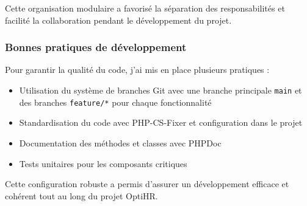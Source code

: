 Cette organisation modulaire a favorisé la séparation des responsabilités et facilité la collaboration pendant le développement du projet.

\subsubsection{Bonnes pratiques de développement}
Pour garantir la qualité du code, j'ai mis en place plusieurs pratiques :

\begin{itemize}
    \item Utilisation du système de branches Git avec une branche principale \texttt{main} et des branches \texttt{feature/*} pour chaque fonctionnalité
    \item Standardisation du code avec PHP-CS-Fixer et configuration dans le projet
    \item Documentation des méthodes et classes avec PHPDoc
    \item Tests unitaires pour les composants critiques
\end{itemize}

Cette configuration robuste a permis d'assurer un développement efficace et cohérent tout au long du projet OptiHR.